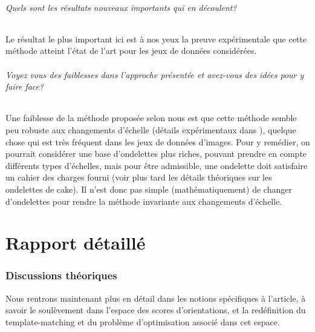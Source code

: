 \documentclass{article}
\begin{document}
\paragraph{Quels sont les résultats nouveaux importants qui en découlent?}
Le résultat le plus important ici est à nos yeux la preuve expérimentale que cette
méthode atteint l'état de l'art pour les jeux de données considérées.
\paragraph{Voyez vous des faiblesses dans l'approche présentée et avez-vous des idées
pour y faire face?}
Une faiblesse de la méthode proposée selon nous est que cette méthode semble peu robuste
aux changements d'échelle (détails expérimentaux dans \ref{part:details}), quelque chose qui est très fréquent dans les jeux de données
d'images. Pour y remédier, on pourrait considérer une base d'ondelettes plus riches,
pouvant prendre en compte différents types d'échelles, mais pour être admissible, une
ondelette doit satisfaire un cahier des charges fourni (voir plus tard les détails
théoriques sur les ondelettes de cake).  Il n'est donc pas simple (mathématiquement) de
changer d'ondelettes pour rendre la méthode invariante aux changements d'échelle.


\part{Rapport détaillé}\label{part:details}
\section{Discussions théoriques}
Nous rentrons maintenant plus en détail dans les notions spécifiques à l'article, à
savoir le soulèvement dans l'espace des scores d'orientations, et la redéfinition du
template-matching et du problème d'optimisation associé dans cet espace.
\end{document}
